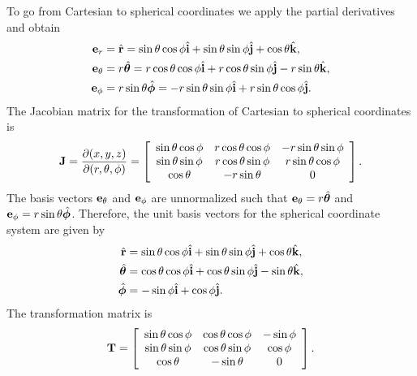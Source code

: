 To go from Cartesian to spherical coordinates we apply the partial derivatives and obtain
\begin{subequations}
\begin{align}
  \mathbf{e}_r      &= \hat{\mathbf{r}}                 =    \sin \theta \cos \phi \hat{\mathbf{i}} +   \sin \theta \sin \phi \hat{\mathbf{j}} +    \cos \theta \hat{\mathbf{k}} , \\
  \mathbf{e}_\theta &= r \hat{\boldsymbol\theta}           =  r \cos \theta \cos \phi \hat{\mathbf{i}} + r \cos \theta \sin \phi \hat{\mathbf{j}} - r \sin \theta \hat{\mathbf{k}} , \\
  \mathbf{e}_\phi   &= r \sin \theta \hat{\boldsymbol\phi} = -r \sin \theta \sin \phi \hat{\mathbf{i}} + r \sin \theta \cos \phi \hat{\mathbf{j}} . 
\end{align}
\end{subequations}
The Jacobian matrix for the transformation of Cartesian to spherical coordinates is
\begin{align}
  \mathbf{J} = \frac{ \partial ( x, y, z ) }{ \partial ( r, \theta, \phi ) } =
   \left[ \begin{array}{c c c}
   \sin \theta \cos \phi &  r \cos \theta \cos \phi & -r \sin \theta \sin \phi  \\
   \sin \theta \sin \phi &  r \cos \theta \sin \phi &  r \sin \theta \cos \phi \\ 
   \cos \theta           & -r \sin \theta           &  0           \\ \end{array} \right] .
\end{align}
The basis vectors $\mathbf{e}_\theta$ and $\mathbf{e}_\phi$ are unnormalized such that $\mathbf{e}_\theta = r \hat{\boldsymbol\theta}$ and $\mathbf{e}_\phi = r \sin \theta \hat{\boldsymbol\phi}$. Therefore, the unit basis vectors for the spherical coordinate system are given by
\begin{subequations}
\begin{align}
  \hat{\mathbf{r}}     &=  \sin \theta \cos \phi \hat{\mathbf{i}} +  \sin \theta \sin \phi \hat{\mathbf{j}} +  \cos \theta \hat{\mathbf{k}} , \\
  \hat{\boldsymbol\theta} &=  \cos \theta \cos \phi \hat{\mathbf{i}} +  \cos \theta \sin \phi \hat{\mathbf{j}} -  \sin \theta \hat{\mathbf{k}} , \\
  \hat{\boldsymbol\phi}   &= -\sin \phi \hat{\mathbf{i}} + \cos \phi \hat{\mathbf{j}} . 
\end{align}
\end{subequations}
The transformation matrix is
\begin{align}
  \mathbf{T}  =
   \left[ \begin{array}{c c c}
   \sin \theta \cos \phi &  \cos \theta \cos \phi & -\sin \phi \\
   \sin \theta \sin \phi &  \cos \theta \sin \phi &  \cos \phi \\ 
   \cos \theta           & -\sin \theta           &  0         \\ \end{array} \right] .
\end{align}


